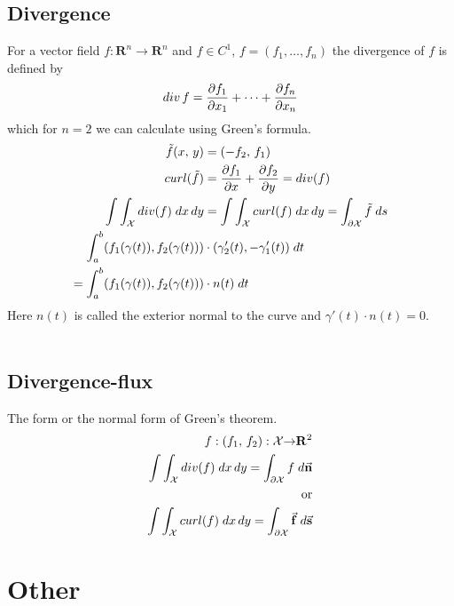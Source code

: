 \documentclass[8pt]{extarticle}
\newcommand{\R}{{\mathbb R}}
\newcommand{\X}{{\mathcal X}}
\newcommand{\ra}{{\rightarrow}}
\def\R{\mathbf{R}}
\begin{document}
\begin{multicols*}{3}
  \subsection{Divergence}
  For a vector field $f: \R^n \ra \R^n$ and $f \in C^1$,
  $f = (f_1, \dots, f_n)$ the divergence of $f$ is defined by
  \begin{align*}
    div \, f = \pdv{f_1}{x_1} + \dots + \pdv{f_n}{x_n}
  \end{align*}
  which for $n = 2$ we can calculate using Green's formula.
  \begin{align*}
    \tilde{f}(x, \, y)                          & = (-f_2, \, f_1)                                                        \\
    curl(\tilde{f})                             & = \pdv{f_1}{x} + \pdv{f_2}{y} = div(f)                                  \\
    \int \int_\X div(f) \; dx \, dy             & = \int \int_\X curl(f) \; dx \, dy = \int_{\partial \X} \tilde{f} \; ds \\
    \int_a^b (f_1(\gamma(t)), f_2(\gamma(t)))   & \cdot (\gamma_2'(t), - \gamma_1'(t)) \; dt                              \\
    = \int_a^b (f_1(\gamma(t)), f_2(\gamma(t))) & \cdot n(t) \; dt
  \end{align*}
  Here $n(t)$ is called the exterior normal to
  the curve and $\gamma'(t) \cdot n(t) = 0$.\\ \\
  \subsection{Divergence-flux}
  The form or the normal form of Green's theorem.
  \begin{align*}
    f:(f_1, \, f_2): \X \ra \R^2                                                               \\
    \int \int_\X div(f) \; dx \, dy = \int_{\partial \X} f \; d \vectorarrow{n}                \\
    \text{or}                                                                                  \\
    \int \int_\X curl(f) \; dx \, dy = \int_{\partial \X} \vectorarrow{f} \; d \vectorarrow{s} \\
  \end{align*}
  \section{Other}
  \hypertarget{sec:3}{}


\end{multicols*}
\end{document}
